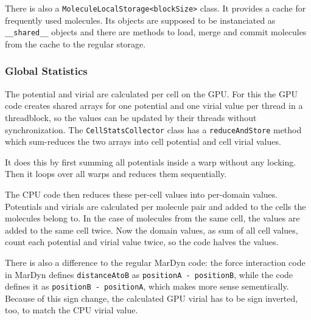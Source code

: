 There is also a \lstinline!MoleculeLocalStorage<blockSize>! class. It provides a cache for frequently used molecules. Its objects are supposed to be instanciated as \lstinline!__shared__! objects and there are methods to load, merge and commit molecules from the cache to the regular storage.

\subsubsection{Global Statistics}
The potential and virial are calculated per cell on the GPU. For this the GPU code creates shared arrays for one potential and one virial value per thread in a threadblock, so the values can be updated by their threads without synchronization. The \lstinline!CellStatsCollector! class has a \lstinline!reduceAndStore! method which sum-reduces the two arrays into cell potential and cell virial values.

It does this by first summing all potentials inside a warp without any locking. Then it loops over all warps and reduces them sequentially.

The CPU code then reduces these per-cell values into per-domain values. Potentials and virials are calculated per molecule pair and added to the cells the molecules belong to. In the case of molecules from the same cell, the values are added to the same cell twice. Now the domain values, as sum of all cell values, count each potential and virial value twice, so the code halves the values.

There is also a difference to the regular MarDyn code: the force interaction code in MarDyn defines \lstinline!distanceAtoB! as \lstinline!positionA - positionB!, while the \cuda{} code defines it as \lstinline!positionB - positionA!, which makes more sense sementically. Because of this sign change, the calculated GPU virial has to be sign inverted, too, to match the CPU virial value.

